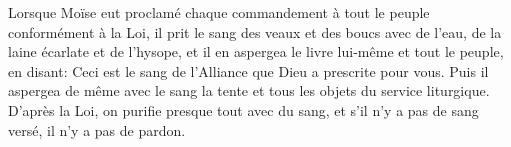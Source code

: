 Lorsque Moïse eut proclamé chaque commandement à tout le peuple
		conformément à la Loi,
	il prit le sang des veaux et des boucs avec de l’eau,
	de la laine écarlate et de l’hysope,
	et il en aspergea le livre lui-même et tout le peuple,
	en disant: Ceci est le sang de l’Alliance que Dieu a prescrite pour vous.
Puis il aspergea de même avec le sang
	la tente et tous les objets du service liturgique.
D’après la Loi, on purifie presque tout avec du sang,
	et s’il n’y a pas de sang versé, il n’y a pas de pardon.

